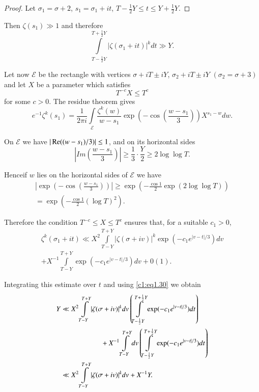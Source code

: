\begin{proof}
  Let $\sigma_1 = \sigma +2$, $s_1 = \sigma_1 + it $, $T -
  \frac{1}{2} Y \leq t \leq Y + \frac{1}{2} Y$.
\end{proof}

Then $\zeta (s_1) \gg 1$ and therefore 
\begin{equation}
\int\limits_{T- \frac{1}{2}Y}^{T + \frac{1}{2}Y} |\zeta (\sigma_1 +
it )|^k dt \gg Y.
\label{c1:eq1.30}
\end{equation}

Let now $\mathscr{E}$ be the rectangle with vertices $\sigma+ i T \pm
i Y$, $\sigma_2 + i T \pm i Y$ $(\sigma_2 = \sigma+3)$ and let $X$ be
a parameter which satisfies
$$
T^{-c} X \leq T^c
$$
for some $c >0$. The residue theorem gives
$$
e^{-1} \zeta^k (s_1)= \frac{1}{2 \pi i} \int\limits_{\mathscr{E}}
\frac{\zeta^k (w)}{w- s_1} \exp \left(- \cos \left(\frac{w- s_1}{3} \right)
  \right) X^{s_1-w} dw.
$$

On $\mathscr{E}$ we have $|\operatorname{Re} ((w- s_1)/3)| \leq 1$, and on its
horizontal sides
$$
\left|Im \left(\frac{w- s_1}{3} \right) \right| \geq \frac{1}{3} \cdot
\frac{Y}{2}  \geq 2 \log \log T.
$$

Hence\pageoriginale if $w$ lies on the horizontal sides of
$\mathscr{E}$ we have  
\begin{multline*}
\left|\exp \left(- \cos\left(\frac{w-s_1}{3} \right) \right) \right|
\geq \exp \left(- \frac{\cos 1}{2} \exp (2 \log \log T) \right)\\ 
= \exp \left( - \frac{\cos 1}{2} (\log T)^2 \right).
\end{multline*}

Therefore the condition $T^{-c} \leq X \leq T^c$ ensures that, for a
suitable $c_1 > 0$,
\begin{multline*}
  \zeta^k (\sigma_1 + it ) \ll X^2 \int\limits_{T-Y}^{T+Y}
  |\zeta (\sigma + iv)|^k \exp \left(-c_1 e^{|v-t|/3}\right) dv\\
  + X^{-1} \int\limits_{T-Y}^{T+Y} \exp \left(-c_1 e^{|v-t|/3}\right)dv+ 0(1).
\end{multline*}

Integrating this estimate over $t$ and using \eqref{c1:eq1.30} we
obtain
\begin{align}
  Y & \ll X^2 \int\limits_{T-Y}^{T+Y} |\zeta (\sigma+ iv)|^k dv \left(
  \int\limits_{T- \frac{1}{2}Y}^{T+ \frac{1}{2}Y} \exp (-c_1
  e^{|v-t|/3})dt\right)\label{c1:eq1.31}\\
  & \hspace{2cm} + X^{-1} \int\limits_{T-Y}^{T+Y} dv
  \left(\int\limits_{T- \frac{1}{2}Y}^{T+ \frac{1}{2}Y} \exp (-c_1
  e^{|v-t|/3})dt \right)\notag\\
  & \ll X^2 \int\limits_{T-Y}^{T+Y} |\zeta (\sigma + iv)|^k dv+ X^{-1} Y.\notag
 \end{align}


